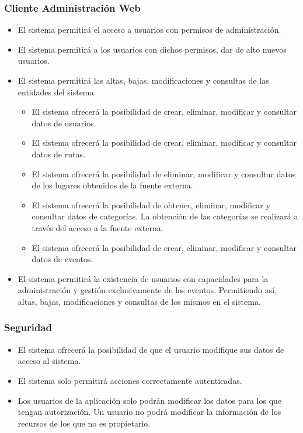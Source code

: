 \subsubsection*{Cliente Administración Web}
\begin{itemize}
\setlength\itemsep{1pt}
\item El sistema permitirá el acceso a usuarios con permisos de administración.
\item El sistema permitirá a los usuarios con dichos permisos, dar de alto nuevos usuarios.
\item El sistema permitirá las altas, bajas, modificaciones y consultas de las entidades del sistema.
	\begin{itemize}
	\item El sistema ofrecerá la posibilidad de crear, eliminar, modificar y consultar datos de usuarios.
	\item El sistema ofrecerá la posibilidad de crear, eliminar, modificar y consultar datos de rutas.
	\item El sistema ofrecerá la posibilidad de eliminar, modificar y consultar datos de los lugares obtenidos de la fuente externa.
	\item El sistema ofrecerá la posibilidad de obtener, eliminar, modificar y consultar datos de categorías. La obtención de las categorías se realizará a través del acceso a la fuente externa.
	\item El sistema ofrecerá la posibilidad de crear, eliminar, modificar y consultar datos de eventos.
	\end{itemize}
\item El sistema permitirá la existencia de usuarios con capacidades para la administración y gestión exclusivamente de los eventos. Permitiendo así, altas, bajas, modificaciones y consultas de los mismos en el sistema.
\end{itemize}

\subsubsection*{Seguridad}
\begin{itemize}
\setlength\itemsep{1pt}
\item El sistema ofrecerá la posibilidad de que el usuario modifique sus datos de acceso al sistema.
\item El sistema solo permitirá acciones correctamente autenticadas.
\item Los usuarios de la aplicación solo podrán modificar los datos para los que tengan autorización. Un usuario no podrá modificar la información de los recursos de los que no es propietario.
\end{itemize}


